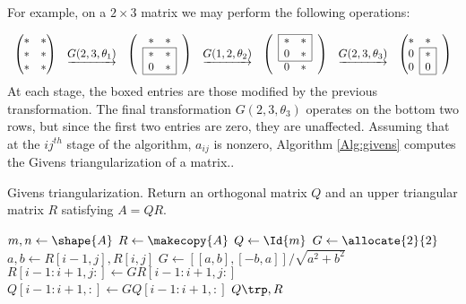 For example, on a $2 \times 3$ matrix we may perform the following operations:

\def\mc#1{\multicolumn{1}{c|}{#1}}
\def\lc#1{\multicolumn{1}{|c}{#1}}
\[
\begin{array}{ccccccc}
\begin{pmatrix}
*&*\\
*&*\\
*&*
\end{pmatrix}
&
\underrightarrow{G(2,3,\theta_1)}
&\begin{pmatrix}
&*&*&\\ \cline{2-3}
&\lc{*}&\mc{*}&\\
&\lc{0}&\mc{*}& \\ \cline{2-3}
\end{pmatrix}
&
\underrightarrow{G(1,2,\theta_2)}
& \begin{pmatrix} \cline{2-3}
&\lc{*}&\mc{*}&\\
&\lc{0}&\mc{*}&\\ \cline{2-3}
&0&*&
\end{pmatrix}
&
\underrightarrow{G(2,3,\theta_3)}
&\begin{pmatrix}
*&*&\\ \cline{2-2}
\mc{0}&\mc{*}&\\
\mc{0}&\mc{0}&\\ \cline{2-2}
\end{pmatrix}
\end{array}
\]
At each stage, the boxed entries are those modified by the previous transformation.
The final transformation $G(2,3,\theta_3)$ operates on the bottom two rows, but since the first two entries are zero, they are unaffected.
Assuming that at the $ij^{th}$ stage of the algorithm, $a_{ij}$ is nonzero, Algorithm \ref{Alg:givens} computes the Givens triangularization of a matrix..


\begin{algorithm}
\begin{algorithmic}[1]
\caption{Givens triangularization. Return an orthogonal matrix $Q$ and an upper triangular matrix $R$ satisfying $A = QR$.}
\label{Alg:givens}
\State $m, n \gets \shape{A}$
\State $R \gets \makecopy{A}$
\State $Q \gets \Id{m}$
\State $G \gets \allocate{2}{2}$
      \State $a, b \gets R[i-1,j], R[i,j]$
      \State $G \gets [[a, b],[-b,a]]/\sqrt{a^2+b^2}$
      \State $R[i-1:i+1, j:] \gets GR[i-1:i+1, j:]$
      \State $Q[i-1:i+1,:] \gets GQ[i-1:i+1,:]$
    \EndFor
\EndFor
\State {} $Q\trp , R$
\EndProcedure
\end{algorithmic}
\end{algorithm}

